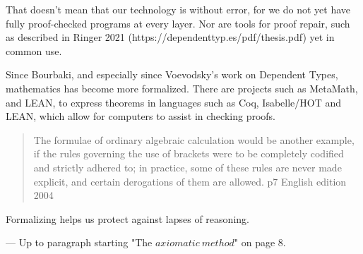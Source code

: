 \documentclass[]{scrartcl}
\begin{document}
That doesn't mean that our technology is without error, for we do not yet have fully proof-checked programs at every layer. Nor are tools for proof repair, such as described in Ringer 2021 (https://dependenttyp.es/pdf/thesis.pdf) yet in common use.

Since Bourbaki, and especially since Voevodsky's work on Dependent Types, mathematics has become more formalized. There are projects such as MetaMath, and LEAN, to express theorems in languages such as Coq, Isabelle/HOT and LEAN, which allow for computers to assist in checking proofs.

\begin{quote}
	The formulae of ordinary algebraic calculation would be another example, if the rules governing the use of brackets were to be completely codified and strictly adhered to; in practice, some of these rules are never made explicit, and certain derogations of them are allowed. p7 English edition 2004
\end{quote}

Formalizing helps us protect against lapses of reasoning.

---
Up to paragraph starting "The $axiomatic\ method$" on page 8.
\end{document}

